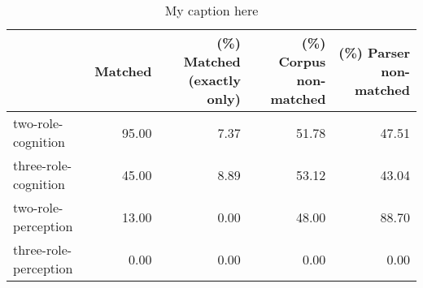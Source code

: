 \begin{table}[!ht]
\centering
\begin{tabular}{lrrrr}
\toprule
{} &  Matched &  (\%) Matched (exactly only) &  (\%) Corpus non-matched &  (\%) Parser non-matched \\
\midrule
two-role-cognition    &    95.00 &                        7.37 &                   51.78 &                   47.51 \\
three-role-cognition  &    45.00 &                        8.89 &                   53.12 &                   43.04 \\
two-role-perception   &    13.00 &                        0.00 &                   48.00 &                   88.70 \\
three-role-perception &     0.00 &                        0.00 &                    0.00 &                    0.00 \\
\bottomrule
\end{tabular}
\caption{My caption here}
\label{tab:MENTAL-oe-relative}
\end{table}
